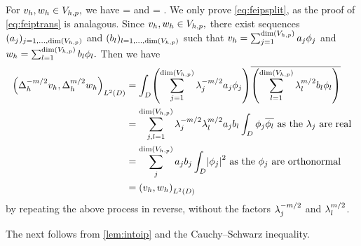 

\label{lem:intoip}
For $v_{h}, w_{h} \in V_{h,p},$ we have
\beq\label{eq:feipsplit}
\IPLtD{\Deltahmmt \vh}{\Deltahmt \wh} = \IPLtD{\vh}{\wh}
\eeq
and
\beq\label{eq:feiptrans}
\IPLtD{\Deltahmt \vh}{\Deltahmt \vh} =  .
\eeq
\ele
{}
We only prove \cref{eq:feipsplit}, as the proof of \cref{eq:feiptrans} is analagous. Since $v_{h},w_{h} \in V_{h,p},$ there exist sequences $(\aj)_{j =1,\ldots,\dimVhp}$ and $(\bsl)_{l =1,\ldots,\dimVhp}$ such that $\vh = \sum_{j=1}^{\dimVhp} \aj\phij$ and $\wh = \sum_{l=1}^{\dimVhp} \bsl \phil.$ Then we have
\begin{align*}
\IPLtD{\Deltahmmt \vh}{\Deltahmt \wh} &= \int_D \mleft(\sum_{j=1}^{\dimVhp}\lambdaj^{-m/2} \aj\phij\mright)\overline{\mleft(\sum_{l=1}^{\dimVhp} \lambdal^{m/2}\bsl \phil\mright)}\\
&= \sum_{j,l=1}^{\dimVhp} \lambdaj^{-m/2} \lambdal^{m/2} \aj \bsl \int_D \phij \philbar \text{ as the } \lambdaj \text{ are real}\\
& =\sum_{j}^{\dimVhp} \aj \bsj \int_D \abs{\phij}^2 \text{ as the } \phij \text{ are orthonormal}\\
&= \IPLtD{\vh}{\wh}
\end{align*}
by repeating the above process in reverse, without the factors $\lambda_{j}^{-m/2}$ and $\lambda_{l}^{m/2}$.
\epf

The next  follows from \cref{lem:intoip} and the Cauchy--Schwarz inequality.


